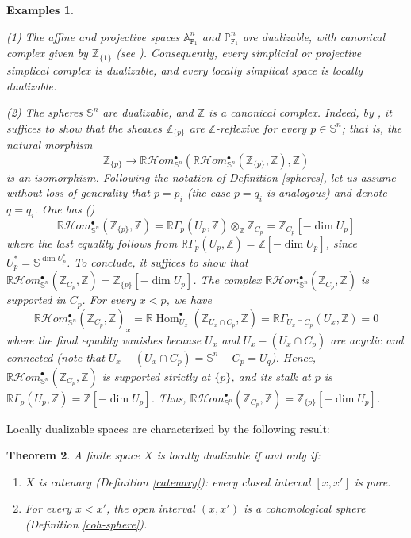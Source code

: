 \documentclass[amssymb,amscd,11pt,20pt]{amsart}
\newcommand{\FF}{{\mathtt F}}
\newcommand{\Sa}{{\mathbb S}}
\newcommand{\ZZ}{{\mathbb Z}}
\newcommand{\PP}{\mathbb P}
\newcommand{\AAA}{\mathbb A}
\newcommand{\RR}{\mathbb R}
\newcommand{\0}{\mathbf 0}
\newcommand{\un}{\mathbf 1}
\DeclareMathOperator{\Hom}{{Hom}}
\newcommand{\pun}{{\scriptscriptstyle \bullet}}
\newcommand{\HHom}{\mathcal{H}om}
\theoremstyle{plain}
\newtheorem{thm}{Theorem}[section]
\newtheorem{ejems}[thm]{Examples}
\numberwithin{equation}{thm}
\begin{document}
\begin{ejems} {\rm $\,$\medskip

  (1) The affine and projective spaces  $\AAA^n_{\FF_1}$ and $ \PP^n_{\FF_1}$ are dualizable, with canonical complex given by $\ZZ_{\{\un\}}$ (see \cite{ST}). Consequently, every simplicial or projective simplical complex is dualizable, and every locally simplical space is locally dualizable. 

(2) The spheres $\mathbb S^n$ are dualizable, and $\ZZ$ is a canonical complex. Indeed, by \cite[Proposition 4.4]{ST2}, it suffices to show   that the sheaves $\ZZ_{\{p\}}$ are $\ZZ$-reflexive for every $p\in\Sa^n$; that is, the natural morphism
\[ \ZZ_{\{p\}}\to\RR\HHom^\pun_{\Sa^n} (\RR\HHom^\pun_{\Sa^n} (\ZZ_{\{p\}},\ZZ),\ZZ)\] is an isomorphism. Following the notation of Definition \ref{spheres}, let us assume without loss of generality  that $p=p_i$ (the case $p=q_i$ is analogous) and  denote $q=q_i$. One has (\cite[Proposition 2.5, (1)]{ST2}) $$\RR\HHom^\pun_{\Sa^n} (\ZZ_{\{p\}},\ZZ)=\RR\Gamma_p(U_p,\ZZ)\otimes_\ZZ \ZZ_{C_p} = \ZZ_{C_p}[-\dim U_p]$$ 
where the last equality follows from  $\RR\Gamma_p(U_p,\ZZ)=\ZZ[-\dim U_p]$, since $U_p^*=\Sa^{\dim U_p^*}$. To conclude, it suffices to show that $\RR\HHom^\pun_{\Sa^n} (\ZZ_{C_p},\ZZ)=\ZZ_{\{p\}}[-\dim U_p]$. The complex $\RR\HHom^\pun_{\Sa^n} (\ZZ_{C_p},\ZZ)$ is supported in $C_p$. For every $x<p$, we have
\[\RR\HHom^\pun_{\Sa^n} (\ZZ_{C_p},\ZZ)_x= \RR\Hom^\pun_{U_x} (\ZZ_{U_x\cap C_p},\ZZ) =\RR\Gamma_{U_x\cap C_p}(U_x,\ZZ)=0\] where the final equality vanishes because  $U_x$ and $U_x-(U_x\cap C_p)$ are acyclic and connected (note that $U_x-(U_x\cap C_p)=\Sa^n-C_p=U_q$). Hence, $\RR\HHom^\pun_{\Sa^n} (\ZZ_{C_p},\ZZ)$ is supported strictly at $\{p\}$, and its stalk at $p$ is $\RR\Gamma_p(U_p,\ZZ)=\ZZ[-\dim U_p]$. Thus, $\RR\HHom^\pun_{\Sa^n} (\ZZ_{C_p},\ZZ)=\ZZ_{\{p\}}[-\dim U_p]$.}

\end{ejems}


Locally dualizable spaces are characterized by the following result:
\begin{thm}\cite[Cor. 4.17]{ST2}\label{locallydualizable} A finite space  $X$ is locally dualizable if and only if:
\begin{enumerate}\item $X$ is catenary (Definition \ref{catenary}): every closed interval $[x,x']$ is pure.
\item For every $x<x'$, the open interval $(x,x')$ is a cohomological sphere (Definition \ref{coh-sphere}).
\end{enumerate}
\end{thm}
\end{document}
